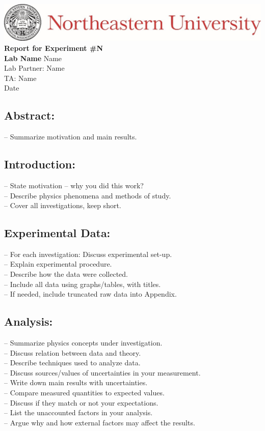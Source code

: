 \documentclass[12pt]{article}
\begin{document}
	\begin{center}
		\includegraphics{Header}
		\vfill		
		\textbf{\Large{Report for Experiment \#N\\
		Lab Name}}
		\vfill
		Name\\
		Lab Partner: Name\\
		TA: Name\\
		Date
		\vfill
	\end{center}
	
	\subsection*{Abstract:}
		– Summarize motivation and main results.
	
	\newpage
	
	\subsection*{Introduction:}
		– State motivation – why you did this work?\\
		– Describe physics phenomena and methods of study.\\
		– Cover all investigations, keep short.\\
	\subsection*{Experimental Data:} 
		– For each investigation: Discuss experimental set-up.\\
		– Explain experimental procedure.\\
		– Describe how the data were collected.\\
		– Include all data using graphs/tables, with titles.\\
		– If needed, include truncated raw data into Appendix.\\
	\subsection*{Analysis:}
		– Summarize physics concepts under investigation.\\
		– Discuss relation between data and theory.\\
		– Describe techniques used to analyze data.\\
		– Discuss sources/values of uncertainties in your measurement.\\
		– Write down main results with uncertainties.\\
		– Compare measured quantities to expected values.\\
		– Discuss if they match or not your expectations.\\
		– List the unaccounted factors in your analysis.\\
		– Argue why and how external factors may affect the results.\\
\end{document}
